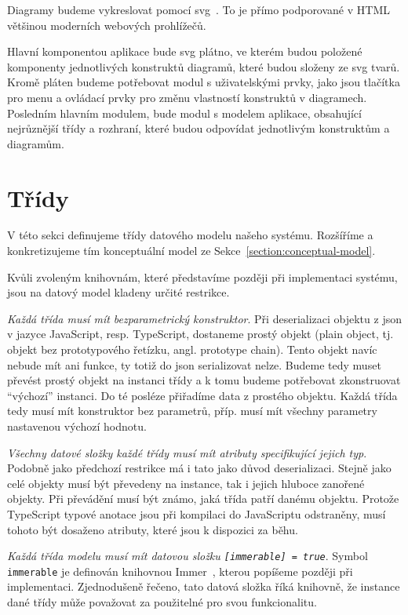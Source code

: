 Diagramy budeme vykreslovat pomocí \acrfull{svg}~\cite{brinza_svg_2018}.
To je přímo podporované v HTML většinou moderních webových prohlížečů.

Hlavní komponentou aplikace bude \acrshort{svg} plátno, ve kterém budou položené komponenty jednotlivých konstruktů diagramů, které budou složeny ze \acrshort{svg} tvarů.
Kromě pláten budeme potřebovat modul s uživatelskými prvky, jako jsou tlačítka pro menu a ovládací prvky pro změnu vlastností konstruktů v diagramech.
Posledním hlavním modulem, bude modul s modelem aplikace, obsahující nejrůznější třídy a rozhraní, které budou odpovídat jednotlivým konstruktům a diagramům.

\section{Třídy}\label{section:classes}

V této sekci definujeme třídy datového modelu našeho systému.
Rozšíříme a konkretizujeme tím konceptuální model ze Sekce~\ref{section:conceptual-model}.

Kvůli zvoleným knihovnám, které představíme později při implementaci systému, jsou na datový model kladeny určité restrikce.

\emph{Každá třída musí mít bezparametrický konstruktor}.
Při deserializaci objektu z \acrshort{json} v jazyce JavaScript, resp. TypeScript, dostaneme prostý objekt (plain object, tj. objekt bez prototypového řetízku, angl. prototype chain).
Tento objekt navíc nebude mít ani funkce, ty totiž do \acrshort{json} serializovat nelze.
Budeme tedy muset převést prostý objekt na instanci třídy a k tomu budeme potřebovat zkonstruovat \enquote{výchozí} instanci.
Do té posléze přiřadíme data z prostého objektu.
Každá třída tedy musí mít konstruktor bez parametrů, příp. musí mít všechny parametry nastavenou výchozí hodnotu.

\emph{Všechny datové složky každé třídy musí mít atributy specifikující jejich typ}.
Podobně jako předchozí restrikce má i tato jako důvod deserializaci.
Stejně jako celé objekty musí být převedeny na instance, tak i jejich hluboce zanořené objekty.
Při převádění musí být známo, jaká třída patří danému objektu.
Protože TypeScript typové anotace jsou při kompilaci do JavaScriptu odstraněny, musí tohoto být dosaženo atributy, které jsou k dispozici za běhu.

\emph{Každá třída modelu musí mít datovou složku \texttt{[immerable] = true}}.
Symbol \texttt{immerable} je definován knihovnou Immer~\cite{michelweststrate_immer_2017}, kterou popíšeme později při implementaci.
Zjednodušeně řečeno, tato datová složka říká knihovně, že instance dané třídy může považovat za použitelné pro svou funkcionalitu.

